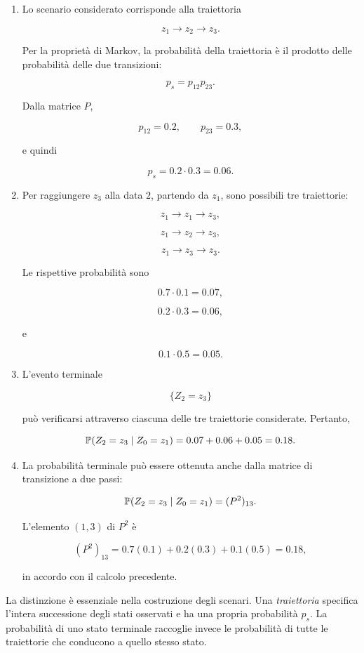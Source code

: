 \begin{enumerate}

\item Lo scenario considerato corrisponde alla traiettoria

\[
z_1
\longrightarrow
z_2
\longrightarrow
z_3.
\]

Per la propriet\`a di Markov, la probabilit\`a della traiettoria \`e il
prodotto delle probabilit\`a delle due transizioni:

\[
p_s
=
p_{12}p_{23}.
\]

Dalla matrice $P$,

\[
p_{12}=0.2,
\qquad
p_{23}=0.3,
\]

e quindi

\[
p_s
=
0.2\cdot0.3
=
0.06.
\]

\item Per raggiungere $z_3$ alla data $2$, partendo da $z_1$, sono possibili
tre traiettorie:

\[
z_1\longrightarrow z_1\longrightarrow z_3,
\]

\[
z_1\longrightarrow z_2\longrightarrow z_3,
\]

\[
z_1\longrightarrow z_3\longrightarrow z_3.
\]

Le rispettive probabilit\`a sono

\[
0.7\cdot0.1
=
0.07,
\]

\[
0.2\cdot0.3
=
0.06,
\]

e

\[
0.1\cdot0.5
=
0.05.
\]

\item L'evento terminale

\[
\{Z_2=z_3\}
\]

pu\`o verificarsi attraverso ciascuna delle tre traiettorie considerate.
Pertanto,

\[
\mathbb{P}(Z_2=z_3\mid Z_0=z_1)
=
0.07+0.06+0.05
=
0.18.
\]

\item La probabilit\`a terminale pu\`o essere ottenuta anche dalla matrice
di transizione a due passi:

\[
\mathbb{P}(Z_2=z_3\mid Z_0=z_1)
=
(P^2)_{13}.
\]

L'elemento $(1,3)$ di $P^2$ \`e

\[
(P^2)_{13}
=
0.7(0.1)+0.2(0.3)+0.1(0.5)
=
0.18,
\]

in accordo con il calcolo precedente.

\end{enumerate}

La distinzione \`e essenziale nella costruzione degli scenari. Una
\emph{traiettoria} specifica l'intera successione degli stati osservati e ha
una propria probabilit\`a $p_s$. La probabilit\`a di uno stato terminale
raccoglie invece le probabilit\`a di tutte le traiettorie che conducono a
quello stesso stato.



